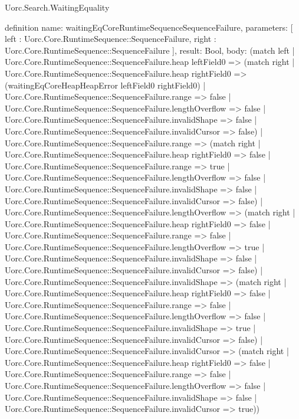 \begin{lexlean}{Uorc.Search.WaitingEquality}
\begin{semanticmodule}
definition{
  name: waitingEqCoreRuntimeSequenceSequenceFailure,
  parameters: [
    left : Uorc.Core.RuntimeSequence::SequenceFailure,
    right : Uorc.Core.RuntimeSequence::SequenceFailure
  ],
  result: Bool,
  body: (match left
    | Uorc.Core.RuntimeSequence::SequenceFailure.heap leftField0 => (match right
      | Uorc.Core.RuntimeSequence::SequenceFailure.heap rightField0 => (waitingEqCoreHeapHeapError leftField0 rightField0)
      | Uorc.Core.RuntimeSequence::SequenceFailure.range => false
      | Uorc.Core.RuntimeSequence::SequenceFailure.lengthOverflow => false
      | Uorc.Core.RuntimeSequence::SequenceFailure.invalidShape => false
      | Uorc.Core.RuntimeSequence::SequenceFailure.invalidCursor => false)
    | Uorc.Core.RuntimeSequence::SequenceFailure.range => (match right
      | Uorc.Core.RuntimeSequence::SequenceFailure.heap rightField0 => false
      | Uorc.Core.RuntimeSequence::SequenceFailure.range => true
      | Uorc.Core.RuntimeSequence::SequenceFailure.lengthOverflow => false
      | Uorc.Core.RuntimeSequence::SequenceFailure.invalidShape => false
      | Uorc.Core.RuntimeSequence::SequenceFailure.invalidCursor => false)
    | Uorc.Core.RuntimeSequence::SequenceFailure.lengthOverflow => (match right
      | Uorc.Core.RuntimeSequence::SequenceFailure.heap rightField0 => false
      | Uorc.Core.RuntimeSequence::SequenceFailure.range => false
      | Uorc.Core.RuntimeSequence::SequenceFailure.lengthOverflow => true
      | Uorc.Core.RuntimeSequence::SequenceFailure.invalidShape => false
      | Uorc.Core.RuntimeSequence::SequenceFailure.invalidCursor => false)
    | Uorc.Core.RuntimeSequence::SequenceFailure.invalidShape => (match right
      | Uorc.Core.RuntimeSequence::SequenceFailure.heap rightField0 => false
      | Uorc.Core.RuntimeSequence::SequenceFailure.range => false
      | Uorc.Core.RuntimeSequence::SequenceFailure.lengthOverflow => false
      | Uorc.Core.RuntimeSequence::SequenceFailure.invalidShape => true
      | Uorc.Core.RuntimeSequence::SequenceFailure.invalidCursor => false)
    | Uorc.Core.RuntimeSequence::SequenceFailure.invalidCursor => (match right
      | Uorc.Core.RuntimeSequence::SequenceFailure.heap rightField0 => false
      | Uorc.Core.RuntimeSequence::SequenceFailure.range => false
      | Uorc.Core.RuntimeSequence::SequenceFailure.lengthOverflow => false
      | Uorc.Core.RuntimeSequence::SequenceFailure.invalidShape => false
      | Uorc.Core.RuntimeSequence::SequenceFailure.invalidCursor => true))
}


\end{semanticmodule}
\end{lexlean}
